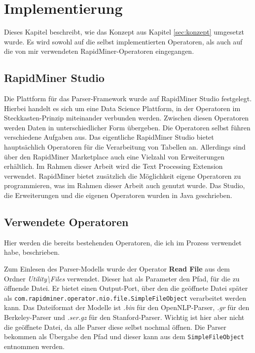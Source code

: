 %
\chapter{Implementierung}
\label{sec:impl}
Dieses Kapitel beschreibt, wie das Konzept aus Kapitel \ref{sec:konzept} umgesetzt wurde. Es wird sowohl auf die selbst implementierten Operatoren, als auch auf die von mir verwendeten RapidMiner-Operatoren eingegangen. 

\section{RapidMiner Studio}
\label{sec:impl:rms}

Die Plattform für das Parser-Framework wurde auf RapidMiner Studio festgelegt. Hierbei handelt es sich um eine Data Science Plattform, in der Operatoren im Steckkasten-Prinzip miteinander verbunden werden. Zwischen diesen Operatoren werden Daten in unterschiedlicher Form übergeben. Die Operatoren selbst führen verschiedene Aufgaben aus. Das eigentliche RapidMiner Studio bietet hauptsächlich Operatoren für die Verarbeitung von Tabellen an. Allerdings sind über den RapidMiner Marketplace auch eine Vielzahl von Erweiterungen erhältlich. Im Rahmen dieser Arbeit wird die Text Processing Extension %
verwendet. RapidMiner bietet zusätzlich die Möglichkeit eigene Operatoren zu programmieren, was im Rahmen dieser Arbeit auch genutzt wurde. Das Studio, die Erweiterungen und die eigenen Operatoren wurden in Java geschrieben. \\

\section{Verwendete Operatoren}

Hier werden die bereits bestehenden Operatoren, die ich im Prozess verwendet habe, beschrieben. 

Zum Einlesen des Parser-Modells wurde der Operator \textbf{Read File} aus dem Ordner \textit{Utility\textbackslash Files} verwendet. Dieser hat als Parameter den Pfad, für die zu öffnende Datei. Er bietet einen Output-Port, über den die geöffnete Datei später als \texttt{com.rapidminer.operator.nio.file.SimpleFileObject} verarbeitet werden kann. Das Dateiformat der Modelle ist \textit{.bin} für den OpenNLP-Parser, \textit{.gr} für den Berkeley-Parser und \textit{.ser.gz} für den Stanford-Parser. Wichtig ist hier aber nicht die geöffnete Datei, da alle Parser diese selbst nochmal öffnen. Die Parser bekommen als Übergabe den Pfad und dieser kann aus dem \texttt{SimpleFileObject} entnommen werden.

